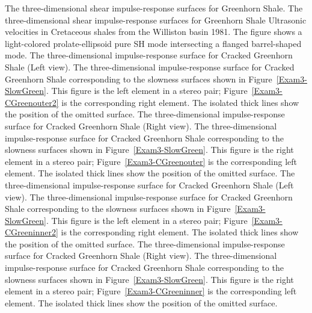 {
The three-dimensional shear impulse-response surfaces for Greenhorn Shale.
}
{
The three-dimensional shear impulse-response surfaces for Greenhorn Shale
{Ultrasonic velocities in Cretaceous shales from the Williston basin}
{1981}.
The figure shows a light-colored prolate-ellipsoid pure SH mode
intersecting a flanged barrel-shaped {\qSV} mode.
}
{
The three-dimensional {} impulse-response surface for Cracked Greenhorn Shale
(Left view).
}
{
The three-dimensional {} impulse-response surface
for Cracked Greenhorn Shale
corresponding to the slowness surfaces shown
in Figure~\protect\ref{Exam3-SlowGreen}.
This figure is the left element in a stereo pair;
Figure~\protect\ref{Exam3-CGreenouter2} is the corresponding right element.
The isolated thick lines show the position of the omitted {} surface.
}
{
The three-dimensional {} impulse-response surface for
Cracked Greenhorn Shale (Right view).
}
{
The three-dimensional {} impulse-response
surface for Cracked Greenhorn Shale
corresponding to the slowness surfaces shown
in Figure~\protect\ref{Exam3-SlowGreen}.
This figure is the right element in a stereo pair;
Figure~\protect\ref{Exam3-CGreenouter} is the corresponding left element.
The isolated thick lines show the position of the omitted {} surface.
}
{
The three-dimensional {} impulse-response
surface for Cracked Greenhorn Shale
(Left view).
}
{
The three-dimensional {} impulse-response
surface for Cracked Greenhorn Shale
corresponding to the slowness surfaces shown
in Figure~\protect\ref{Exam3-SlowGreen}.
This figure is the left element in a stereo pair;
Figure~\protect\ref{Exam3-CGreeninner2} is the corresponding right element.
The isolated thick lines show the position of the omitted {} surface.
}
{
The three-dimensional {} impulse-response surface
for Cracked Greenhorn Shale
(Right view).
}
{
The three-dimensional {} impulse-response surface
for Cracked Greenhorn Shale
corresponding to the slowness surfaces shown
in Figure~\protect\ref{Exam3-SlowGreen}.
This figure is the right element in a stereo pair;
Figure~\protect\ref{Exam3-CGreeninner} is the corresponding left element.
The isolated thick lines show the position of the omitted {} surface.
}

